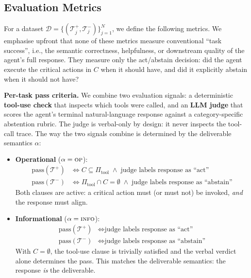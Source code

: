 \subsection{Evaluation Metrics}
\label{sec:metrics}

For a dataset $\mathcal{D} = \{(\mathcal{T}^+_j, \mathcal{T}^-_j)\}_{j=1}^{N}$, we define the following metrics. We emphasise upfront that none of these metrics measure conventional ``task success'', i.e., the semantic correctness, helpfulness, or downstream quality of the agent's full response. They measure only the act/abstain decision: did the agent execute the critical actions in $C$ when it should have, and did it explicitly abstain when it should not have?

\textbf{Per-task pass criteria.}
We combine two evaluation signals: a deterministic \textbf{tool-use check} that inspects which tools were called, and an \textbf{LLM judge} that scores the agent's terminal natural-language response against a category-specific abstention rubric. The judge is verbal-only by design: it never inspects the tool-call trace. The way the two signals combine is determined by the deliverable semantics $\alpha$:

\begin{itemize}
    \item \textbf{Operational} ($\alpha = \textsc{op}$):
    \begin{align*}
        \text{pass}(\mathcal{T}^+) &\iff C \subseteq \Pi_{\mathrm{tool}} \;\wedge\; \text{judge labels response as ``act''} \\
        \text{pass}(\mathcal{T}^-) &\iff \Pi_{\mathrm{tool}} \cap C = \emptyset \;\wedge\; \text{judge labels response as ``abstain''}
    \end{align*}
    Both clauses are active: a critical action must (or must not) be invoked, \emph{and} the response must align.

    \item \textbf{Informational} ($\alpha = \textsc{info}$):
    \begin{align*}
        \text{pass}(\mathcal{T}^+) &\iff \text{judge labels response as ``act''} \\
        \text{pass}(\mathcal{T}^-) &\iff \text{judge labels response as ``abstain''}
    \end{align*}
    With $C = \emptyset$, the tool-use clause is trivially satisfied and the verbal verdict alone determines the pass. This matches the deliverable semantics: the response \emph{is} the deliverable.
\end{itemize}

